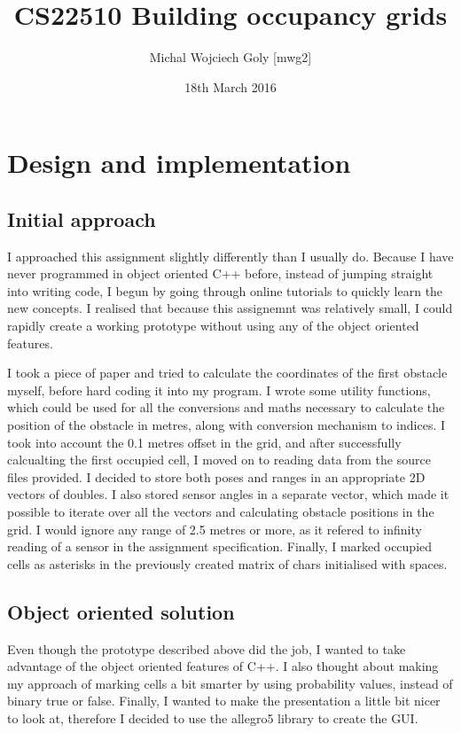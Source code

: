 \documentclass[a4paper, 12pt]{article}
\title{CS22510 Building occupancy grids}
\author{Michal Wojciech Goly [mwg2]}
\date{18th March 2016}
\begin{document}
\maketitle

\section{Design and implementation}
\subsection{Initial approach}
I approached this assignment slightly differently than I usually do.
Because I have never programmed in object oriented C++ before, instead of
jumping straight into writing code, I begun by going through online
tutorials to quickly learn the new concepts. I realised that because this
assignemnt was relatively small, I could rapidly create a working prototype
without using any of the object oriented features. 

I took a piece of paper and tried to calculate the coordinates of the first
obstacle myself, before hard coding it into my program. I wrote some utility
functions, which could be used for all the conversions and maths necessary 
to calculate the position of the obstacle in metres, along with conversion
mechanism to indices. I took into account the 0.1 metres offset in the grid,
and after successfully calcualting the first occupied cell, I moved on to 
reading data from the source files provided. I decided to store both poses
and ranges in an appropriate 2D vectors of doubles. I also stored sensor 
angles in a separate vector, which made it possible to iterate over all the
vectors and calculating obstacle positions in the grid. I would ignore 
any range of 2.5 metres or more, as it refered to infinity reading of a 
sensor in the assignment specification. Finally, I marked occupied cells as
asterisks in the previously created matrix of chars initialised with spaces. 

\subsection{Object oriented solution}
Even though the prototype described above did the job, I wanted to take advantage
of the object oriented features of C++. I also thought about making my 
approach of marking cells a bit smarter by using probability values, instead of
binary true or false. Finally, I wanted to make the presentation a little bit
nicer to look at, therefore I decided to use the allegro5\cite{1} library to 
create the GUI. 
\end{document}
